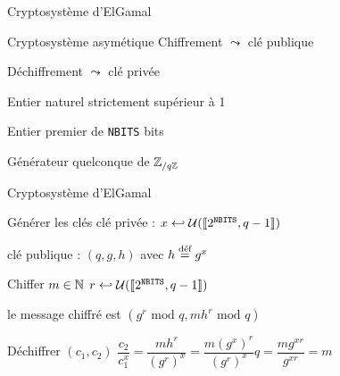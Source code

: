 \documentclass[10pt, compress]{beamer}
\begin{document}
  \begin{frame}{Cryptosystème d'ElGamal}
    \begin{exampleblock}{Cryptosystème asymétique}
      Chiffrement $\leadsto$ clé publique

      Déchiffrement $\leadsto$ clé privée
    \end{exampleblock}
    \pause
    \begin{description}[<+->]
      \item[\texttt{NBITS}] Entier naturel strictement supérieur à 1 
      \item[$q$] Entier premier de \texttt{NBITS} bits
      \item[$g$] Générateur quelconque de \(\Z_{/q\Z}\)
    \end{description}
  \end{frame}

  \begin{frame}{Cryptosystème d'ElGamal}
    \begin{alertblock}{Générer les clés}
      clé privée : \(x\hookleftarrow\UU(\ie{2^{\texttt{NBITS}}, q-1})\)

      clé publique : \((q, g, h)\) avec \(h\egdef g^x\)
    \end{alertblock}
    \pause
    \begin{alertblock}{Chiffer $m\in\N$}
      \(r\hookleftarrow\UU(\ie{2^{\texttt{NBITS}}, q-1})\)

      le message chiffré est \((g^r\text{ mod }q, mh^r\text{ mod }q)\)
    \end{alertblock}
    \pause
    \begin{alertblock}{Déchiffrer $(c_1, c_2)$}
      \(\dfrac{c_2}{c_1^x} = \dfrac{m h^r}{(g^r)^x} = \dfrac{m (g^x)^r}{(g^r)^x}q = \dfrac{m g^{xr}}{g^{xr}} = m\)
    \end{alertblock}
  \end{frame}
\end{document}
